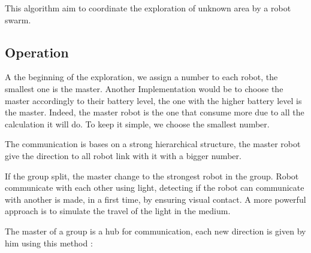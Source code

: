 \documentclass[../main.tex]{subfiles}
\begin{document}
This algorithm aim to coordinate the exploration of unknown area by a robot swarm.

\subsection{Operation}

A the beginning of the exploration, we assign a number to each robot, the smallest one is the master. Another Implementation would be to choose the master accordingly to their battery level, the one with the higher battery level is the master. Indeed, the master robot is the one that consume more due to all the calculation it will do. To keep it simple, we choose the smallest number.

The communication is bases on a strong hierarchical structure, the master robot give the direction to all robot link with it with a bigger number.

If the group split, the master change to the strongest robot in the group.
Robot communicate with each other using light, detecting if the robot can communicate with another is made, in a first time, by ensuring visual contact. A more powerful approach is to simulate the travel of the light in the medium.

The master of a group is a hub for communication, each new direction is given by him using this method :
\end{document}
